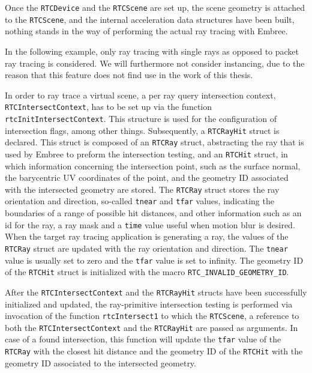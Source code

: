 Once the \texttt{RTCDevice} and the \texttt{RTCScene} are set up, the scene geometry is attached to the \texttt{RTCScene}, and the internal acceleration data structures have been built, nothing stands in the way of performing the actual ray tracing with Embree. 

In the following example, only ray tracing with single rays as opposed to packet ray tracing is considered. We will furthermore not consider instancing, due to the reason that this feature does not find use in the work of this thesis.

In order to ray trace a virtual scene, a per ray query intersection context, \texttt{RTCIntersectContext}, has to be set up via the function \texttt{rtcInitIntersectContext}. This structure is used for the configuration of intersection flags, among other things. 
Subsequently, a \texttt{RTCRayHit} struct is declared. This struct is composed of an \texttt{RTCRay} struct, abstracting the ray that is used by Embree to preform the intersection testing, and an \texttt{RTCHit} struct, in which information concerning the intersection point, such as the surface normal, the barycentric UV coordinates of the point, and the geometry ID associated with the intersected geometry are stored.
The \texttt{RTCRay} struct stores the ray orientation and direction, so-called \texttt{tnear} and \texttt{tfar} values, indicating the boundaries of a range of possible hit distances, and other information such as an id for the ray, a ray mask and a \texttt{time} value useful when motion blur is desired.
When the target ray tracing application is generating a ray, the values of the \texttt{RTCRay} struct are updated with the ray orientation and direction. The \texttt{tnear} value is usually set to zero and the \texttt{tfar} value is set to infinity. The geometry ID of the \texttt{RTCHit} struct is initialized with the macro \texttt{RTC\_INVALID\_GEOMETRY\_ID}.

After the \texttt{RTCIntersectContext} and the \texttt{RTCRayHit} structs have been successfully initialized and updated, the ray-primitive intersection testing is performed via invocation of the function \texttt{rtcIntersect1} to which the \texttt{RTCScene}, a reference to both the \texttt{RTCIntersectContext} and the \texttt{RTCRayHit} are passed as arguments. In case of a found intersection, this function will update the \texttt{tfar} value of the \texttt{RTCRay} with the closest hit distance and the geometry ID of the \texttt{RTCHit} with the geometry ID associated to the intersected geometry.

